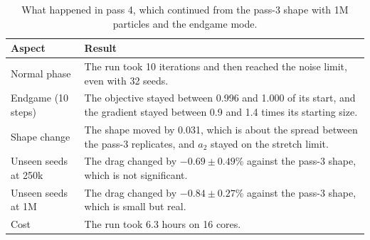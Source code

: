 \documentclass[10pt]{article}
\begin{document}
\begin{table}[H]
\centering
\small
\caption{\label{tab:pass4}What happened in pass 4, which continued from the pass-3 shape with 1M particles and the endgame mode.}
\begin{tabular}{l>{\raggedright\arraybackslash}p{12.2cm}}
\toprule
Aspect & Result \\
\midrule
Normal phase & The run took 10 iterations and then reached the noise limit, even with 32 seeds. \\
Endgame (10 steps) & The objective stayed between 0.996 and 1.000 of its start, and the gradient stayed between 0.9 and 1.4 times its starting size. \\
Shape change & The shape moved by 0.031, which is about the spread between the pass-3 replicates, and $a_2$ stayed on the stretch limit. \\
Unseen seeds at 250k & The drag changed by $-0.69 \pm 0.49$\% against the pass-3 shape, which is not significant. \\
Unseen seeds at 1M & The drag changed by $-0.84 \pm 0.27$\% against the pass-3 shape, which is small but real. \\
Cost & The run took 6.3 hours on 16 cores. \\
\bottomrule
\end{tabular}
\end{table}
\end{document}
